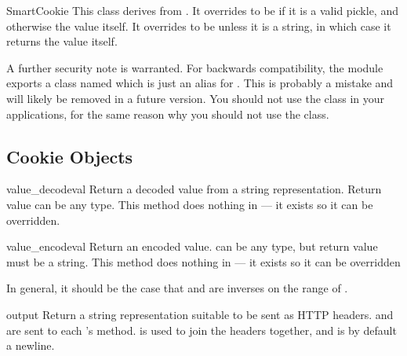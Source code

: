 \begin{classdesc}{SmartCookie}{}
This class derives from . It overrides
 to be  if it is a
valid pickle, and otherwise the value itself. It overrides
 to be  unless it is a
string, in which case it returns the value itself.

\end{classdesc}

A further security note is warranted.  For backwards compatibility,
the  module exports a class named  which
is just an alias for .  This is probably a mistake
and will likely be removed in a future version.  You should not use
the  class in your applications, for the same reason why
you should not use the  class.


\begin{seealso}
\end{seealso}


\subsection{Cookie Objects \label{cookie-objects}}

\begin{methoddesc}[BaseCookie]{value_decode}{val}
Return a decoded value from a string representation. Return value can
be any type. This method does nothing in  --- it exists
so it can be overridden.
\end{methoddesc}

\begin{methoddesc}[BaseCookie]{value_encode}{val}
Return an encoded value.  can be any type, but return value
must be a string. This method does nothing in  --- it exists
so it can be overridden

In general, it should be the case that  and 
 are inverses on the range of .
\end{methoddesc}

\begin{methoddesc}[BaseCookie]{output}{}
Return a string representation suitable to be sent as HTTP headers.
 and  are sent to each 's
 method.  is used to join the headers
together, and is by default a newline.
\end{methoddesc}

